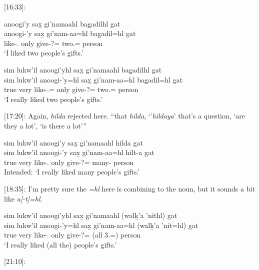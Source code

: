 [16:33]: 

\begin{exe}
    \ex 
    \begin{xlist}
        \item \glll anoogi'y  sax̱ gi'namaahl bag̱adilhl gat \\
    anoogi-'y  sax̱ gi'nam-aa=hl bag̱adil=hl gat  \\
    like-\Fsg{}.\Ii{} only give-\Nmlz{}?=\Cn{} two.\Hum{}=\Cn{} person \\
    `I liked two people's gifts.' 
        \item \glll sim lukw'il anoogi'yhl  sax̱ gi'namaahl bag̱adilhl gat \\
    sim lukw'il anoogi-'y=hl  sax̱ gi'nam-aa=hl bag̱adil=hl gat  \\
    true very like-\Fsg{}.\Ii{}=\Cn{} only give-\Nmlz{}?=\Cn{} two.\Hum{}=\Cn{} person \\
    `I really liked two people's gifts.' 
    \end{xlist}
\end{exe}

[17:20]: Again, \textit{hilda} rejected here. ``that \textit{hilda}, `'\textit{hildaya}' that's a question, `are they a lot', `is there a lot'''

\begin{exe}
    \ex \glll * sim lukw'il anoogi'y  sax̱ gi'namaahl hilda gat \\
    {} sim lukw'il anoogi-'y  sax̱ gi'nam-aa=hl hilt-a gat  \\
    {} true very like-\Fsg{}.\Ii{} only give-\Nmlz{}?=\Cn{} many-\Attr{} person \\
    Intended: `I really liked many people's gifts.' 
\end{exe}

[18:35]: I'm pretty sure the \textit{=hl} here is combining to the noun, but it sounds a bit like \textit{a[-t]=hl}.

\begin{exe}
    \ex \glll sim lukw'il anoogi'yhl  sax̱ gi'namaahl (walḵ'a 'nithl) gat \\
    sim lukw'il anoogi-'y=hl  sax̱ gi'nam-aa=hl (walḵ'a 'nit=hl)  gat  \\
    true very like-\Fsg{}.\Ii{} only give-\Nmlz{}?=\Cn{} (all 3.\I{}=\Cn{}) person \\
    `I really liked (all the) people's gifts.' 
\end{exe}

[21:10]:

